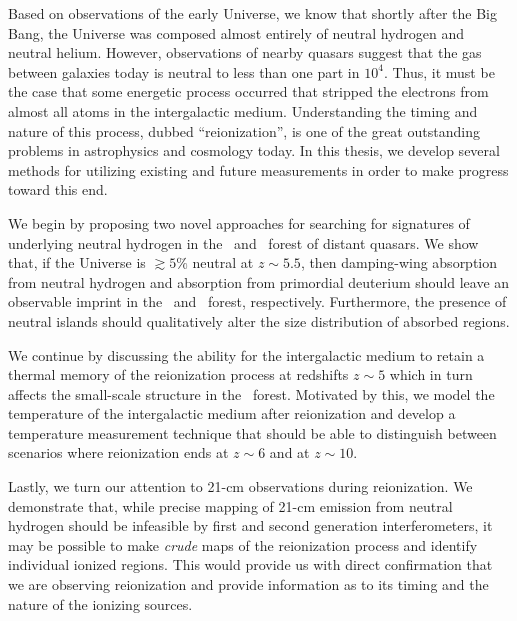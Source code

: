 

\begin{abstracts}

Based on observations of the early Universe, we know that shortly after the Big Bang, the Universe was composed almost entirely of neutral hydrogen and neutral helium. However, observations of nearby quasars suggest that the gas between galaxies today is neutral to less than one part in $10^{4}$.  Thus, it must be the case that some energetic process occurred that stripped the electrons from almost all atoms in the intergalactic medium. Understanding the timing and nature of this process, dubbed ``reionization'', is one of the great outstanding problems in astrophysics and cosmology today. In this thesis, we develop several methods for utilizing existing and future measurements in order to make progress toward this end.


We begin by proposing two novel approaches for searching for signatures of underlying neutral hydrogen in the \lya\ and \lyb\ forest of distant quasars. We show that, if the Universe is $\gtrsim 5\%$ neutral at $z \sim 5.5$, then damping-wing absorption from neutral hydrogen and absorption from primordial deuterium should leave an observable imprint in the \lya\ and \lyb\ forest, respectively. Furthermore, the presence of neutral islands should qualitatively alter the size distribution of absorbed regions.


We continue by discussing the ability for the intergalactic medium to retain a thermal memory of the reionization process at redshifts $z \sim 5$ which in turn affects the small-scale structure in the \lya\ forest. Motivated by this, we model the temperature of the intergalactic medium after reionization and develop a temperature measurement technique that should be able to distinguish between  scenarios where reionization ends at $z \sim 6$ and at $z \sim 10$. 


Lastly, we turn our attention to 21-cm observations during reionization. We demonstrate that, while precise mapping of 21-cm emission from neutral hydrogen should be infeasible by first and second generation interferometers, it may be possible to make \textit{crude} maps of the reionization process and identify individual ionized regions. This would provide us with direct confirmation that we are observing reionization and provide information as to its timing and the nature of the ionizing sources.




\end{abstracts}

